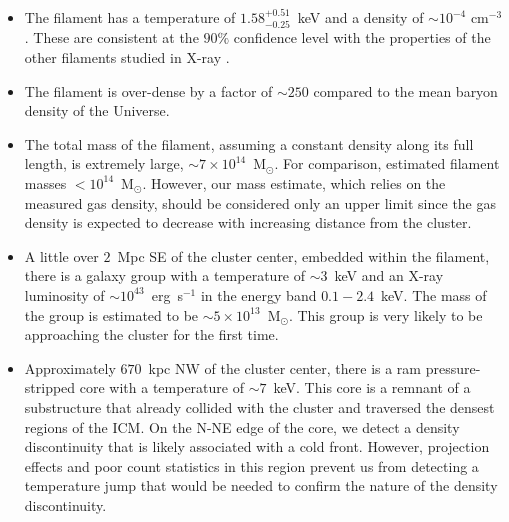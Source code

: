 \begin{itemize}
	\item The filament has a temperature of $1.58_{-0.25}^{+0.51}$~keV and a density of $\sim 10^{-4}$ cm$^{-3}$. These are consistent at the $90\%$ confidence level with the properties of the other filaments studied in X-ray \citep{Werner2008, Eckert2015, Bulbul2016}.
	\item The filament is over-dense by a factor of $\sim 250$ compared to the mean baryon density of the Universe.
	\item The total mass of the filament, assuming a constant density along its full length, is extremely large, $\sim 7\times 10^{14}$~M$_\odot$. For comparison, \citet{Eckert2015} estimated filament masses $<10^{14}$~M$_\odot$. However, our mass estimate,  which relies on the measured gas density, should be considered only an upper limit since the gas density is expected to decrease with increasing distance from the cluster.
	\item A little over $2$~Mpc SE of the cluster center, embedded within the filament, there is a galaxy group with a temperature of $\sim 3$~keV and an X-ray luminosity of $\sim 10^{43}$~erg~s$^{-1}$ in the energy band $0.1-2.4$~keV. The mass of the group is estimated to be $\sim 5\times 10^{13}$~M$_\odot$. This group is very likely to be approaching the cluster for the first time.
	\item Approximately $670$~kpc NW of the cluster center, there is a ram pressure-stripped core with a temperature of $\sim 7$~keV. This core is a remnant of a substructure that already collided with the cluster and traversed the densest regions of the ICM. On the N-NE edge of the core, we detect a density discontinuity that is likely associated with a cold front. However, projection effects and poor count statistics in this region prevent us from detecting a temperature jump that would be needed to confirm the nature of the density discontinuity.
\end{itemize}